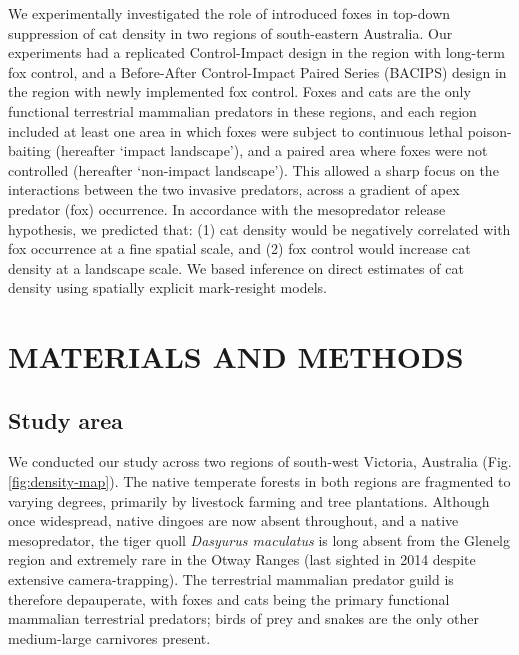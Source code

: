 \documentclass[]{elsarticle} %
\begin{document}
We experimentally investigated the role of introduced foxes in top-down suppression of cat density in two regions of south-eastern Australia. Our experiments had a replicated Control-Impact design in the region with long-term fox control, and a Before-After Control-Impact Paired Series (BACIPS) design in the region with newly implemented fox control. Foxes and cats are the only functional terrestrial mammalian predators in these regions, and each region included at least one area in which foxes were subject to continuous lethal poison-baiting (hereafter `impact landscape'), and a paired area where foxes were not controlled (hereafter `non-impact landscape'). This allowed a sharp focus on the interactions between the two invasive predators, across a gradient of apex predator (fox) occurrence. In accordance with the mesopredator release hypothesis, we predicted that: (1) cat density would be negatively correlated with fox occurrence at a fine spatial scale, and (2) fox control would increase cat density at a landscape scale. We based inference on direct estimates of cat density using spatially explicit mark-resight models.

\newpage

\hypertarget{materials-and-methods}{%
\section{MATERIALS AND METHODS}\label{materials-and-methods}}

\hypertarget{study-area}{%
\subsection{Study area}\label{study-area}}

We conducted our study across two regions of south-west Victoria, Australia (Fig. \ref{fig:density-map}). The native temperate forests in both regions are fragmented to varying degrees, primarily by livestock farming and tree plantations. Although once widespread, native dingoes are now absent throughout, and a native mesopredator, the tiger quoll \emph{Dasyurus maculatus} is long absent from the Glenelg region and extremely rare in the Otway Ranges (last sighted in 2014 despite extensive camera-trapping). The terrestrial mammalian predator guild is therefore depauperate, with foxes and cats being the primary functional mammalian terrestrial predators; birds of prey and snakes are the only other medium-large carnivores present.
\end{document}
